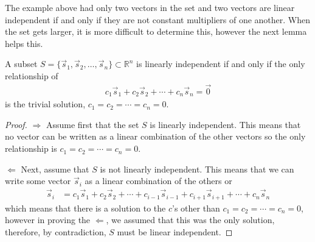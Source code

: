The example above had only two vectors in the set and two vectors are linear independent if and only if they are not constant multipliers of one another.  When the set gets larger, it is more difficult to determine this, however the next lemma helps this.

\begin{lemma}  \label{lemma:lin:ind}
A subset $S=\{\vec{s}_1, \vec{s}_2, \ldots, \vec{s}_n\} \subset \mathbb{R}^n$ is linearly independent if and only if the only relationship of
%
\begin{align*}
c_1 \vec{s}_1 + c_2 \vec{s}_2 + \cdots + c_n \vec{s}_n = \vec{0}
\end{align*}
is the trivial solution, $c_1=c_2 = \cdots = c_n =0$.

\end{lemma}

\begin{proof}
$\Longrightarrow$ Assume first that the set $S$ is linearly independent.   This means that no vector can be written as a linear combination of the other vectors so the only relationship is $c_1=c_2 = \cdots = c_n =0$.

$\Longleftarrow$ Next, assume that $S$ is not linearly independent.  This means that we can write some vector $\vec{s}_i$ as a linear combination of the others or
%
\begin{align*}
\vec{s}_i & = c_1 \vec{s}_1 + c_2 \vec{s}_2 + \cdots + c_{i-1} \vec{s}_{i-1} + c_{i+1} \vec{s}_{i+1} + \cdots + c_n \vec{s}_n
\end{align*}
which means that there is a solution to the $c$'s other than $c_1=c_2 = \cdots = c_n =0$, however in proving the $\Longleftarrow$, we assumed that this was the only solution, therefore, by contradiction, $S$ must be linear independent.
\end{proof}

\vspace{1in}

